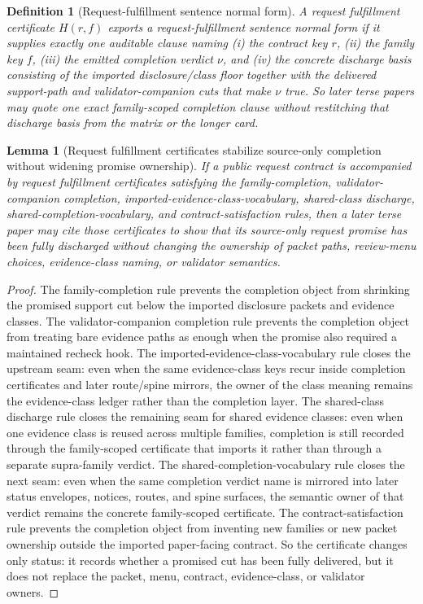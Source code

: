 \documentclass[11pt]{article}
\newtheorem{definition}{Definition}
\newtheorem{lemma}{Lemma}
\begin{document}
\begin{definition}[Request-fulfillment sentence normal form]
A request fulfillment certificate $H(r,f)$ exports a \emph{request-fulfillment sentence normal form} if it supplies exactly one auditable clause naming (i) the contract key $r$, (ii) the family key $f$, (iii) the emitted completion verdict $\nu$, and (iv) the concrete discharge basis consisting of the imported disclosure/class floor together with the delivered support-path and validator-companion cuts that make $\nu$ true.
So later terse papers may quote one exact family-scoped completion clause without restitching that discharge basis from the matrix or the longer card.
\end{definition}

\begin{lemma}[Request fulfillment certificates stabilize source-only completion without widening promise ownership]
If a public request contract is accompanied by request fulfillment certificates satisfying the family-completion, validator-companion completion, imported-evidence-class-vocabulary, shared-class discharge, shared-completion-vocabulary, and contract-satisfaction rules, then a later terse paper may cite those certificates to show that its source-only request promise has been fully discharged without changing the ownership of packet paths, review-menu choices, evidence-class naming, or validator semantics.
\end{lemma}

\begin{proof}
The family-completion rule prevents the completion object from shrinking the promised support cut below the imported disclosure packets and evidence classes.
The validator-companion completion rule prevents the completion object from treating bare evidence paths as enough when the promise also required a maintained recheck hook. The imported-evidence-class-vocabulary rule closes the upstream seam: even when the same evidence-class keys recur inside completion certificates and later route/spine mirrors, the owner of the class meaning remains the evidence-class ledger rather than the completion layer.
The shared-class discharge rule closes the remaining seam for shared evidence classes: even when one evidence class is reused across multiple families, completion is still recorded through the family-scoped certificate that imports it rather than through a separate supra-family verdict. The shared-completion-vocabulary rule closes the next seam: even when the same completion verdict name is mirrored into later status envelopes, notices, routes, and spine surfaces, the semantic owner of that verdict remains the concrete family-scoped certificate. The contract-satisfaction rule prevents the completion object from inventing new families or new packet ownership outside the imported paper-facing contract.
So the certificate changes only status: it records whether a promised cut has been fully delivered, but it does not replace the packet, menu, contract, evidence-class, or validator owners.\qedhere
\end{proof}
\end{document}
